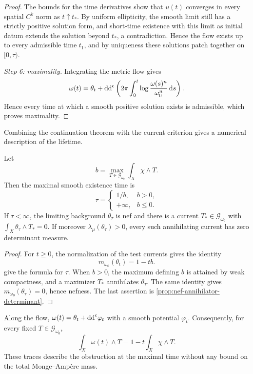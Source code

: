 \begin{proof}
The bounds for the time derivatives show that $u(t)$ converges in every spatial $C^k$ norm as $t\uparrow t_*$. By uniform ellipticity, the smooth limit still has a strictly positive solution form, and short-time existence with this limit as initial datum extends the solution beyond $t_*$, a contradiction. Hence the flow exists up to every admissible time $t_1$, and by uniqueness these solutions patch together on $[0,\tau)$.

\emph{Step 6: maximality.} Integrating the metric flow gives
\[
 \omega(t)=\theta_t+\mathrm{dd}^{\mathrm{c}}\left(2\pi\int_0^t
                   \log\frac{\omega(s)^n}{\omega_0^n}\,\mathrm{d}s\right).
\]
Hence every time at which a smooth positive solution exists is admissible, which proves maximality.
\end{proof}

Combining the continuation theorem with the current criterion gives a numerical description of the lifetime.

\begin{corollary}\label{cor:chern-ricci-current-lifetime}
Let
\[
 b=\max_{T\in\mathscr G_{\omega_0}}\int_X\chi\wedge T.
\]
Then the maximal smooth existence time is
\[
 \tau=\begin{cases}1/b,&b>0,\\+\infty,&b\leq0.\end{cases}
\]
If $\tau<\infty$, the limiting background $\theta_\tau$ is nef and there is a current $T_*\in\mathscr G_{\omega_0}$ with $\int_X\theta_\tau\wedge T_*=0$. If moreover $\lambda_\mu(\theta_\tau)>0$, every such annihilating current has zero determinant measure.
\end{corollary}
\begin{proof}
For $t\geq0$, the normalization of the test currents gives the identity
\[
 m_{\omega_0}(\theta_t)=1-tb.
\]
 give the formula for $\tau$. When $b>0$, the maximum defining $b$ is attained by weak compactness, and a maximizer $T_*$ annihilates $\theta_\tau$. The same identity gives $m_{\omega_0}(\theta_\tau)=0$, hence nefness. The last assertion is \cref{prop:nef-annihilator-determinant}.
\end{proof}

Along the flow, $\omega(t)=\theta_t+\mathrm{dd}^{\mathrm{c}}\varphi_t$ with a smooth potential $\varphi_t$. Consequently, for every fixed $T\in\mathscr G_{\omega_0}$,
\[
 \int_X\omega(t)\wedge T
       =1-t\int_X\chi\wedge T.
\]
These traces describe the obstruction at the maximal time without any bound on the total Monge--Amp\`ere mass.



